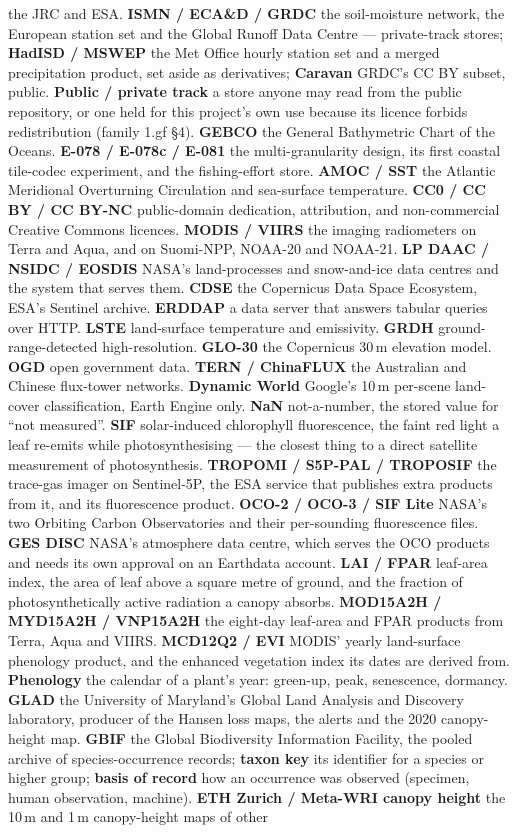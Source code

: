 \documentclass[10pt]{article}
\begin{document}
the JRC and ESA. \textbf{ISMN / ECA\&D / GRDC} the soil-moisture network, the European station set and the Global Runoff Data Centre --- private-track stores; \textbf{HadISD / MSWEP} the Met Office hourly station set and a merged precipitation product, set aside as derivatives; \textbf{Caravan} GRDC's CC BY subset, public. \textbf{Public / private track} a store anyone may read from the public repository, or one held for this project's own use because its licence forbids redistribution (family 1.gf \S4). \textbf{GEBCO} the General Bathymetric Chart of the Oceans. \textbf{E-078 / E-078c / E-081} the multi-granularity design, its first coastal tile-codec experiment, and the fishing-effort store. \textbf{AMOC / SST} the Atlantic Meridional Overturning Circulation and sea-surface temperature. \textbf{CC0 / CC BY / CC BY-NC} public-domain dedication, attribution, and non-commercial Creative Commons licences. \textbf{MODIS / VIIRS} the imaging radiometers on Terra and Aqua, and on Suomi-NPP, NOAA-20 and NOAA-21. \textbf{LP DAAC / NSIDC / EOSDIS} NASA's land-processes and snow-and-ice data centres and the system that serves them. \textbf{CDSE} the Copernicus Data Space Ecosystem, ESA's Sentinel archive. \textbf{ERDDAP} a data server that answers tabular queries over HTTP. \textbf{LSTE} land-surface temperature and emissivity. \textbf{GRDH} ground-range-detected high-resolution. \textbf{GLO-30} the Copernicus 30\,m elevation model. \textbf{OGD} open government data. \textbf{TERN / ChinaFLUX} the Australian and Chinese flux-tower networks. \textbf{Dynamic World} Google's 10\,m per-scene land-cover classification, Earth Engine only. \textbf{NaN} not-a-number, the stored value for ``not measured''. \textbf{SIF} solar-induced chlorophyll fluorescence, the faint red light a leaf re-emits while photosynthesising --- the closest thing to a direct satellite measurement of photosynthesis. \textbf{TROPOMI / S5P-PAL / TROPOSIF} the trace-gas imager on Sentinel-5P, the ESA service that publishes extra products from it, and its fluorescence product. \textbf{OCO-2 / OCO-3 / SIF Lite} NASA's two Orbiting Carbon Observatories and their per-sounding fluorescence files. \textbf{GES DISC} NASA's atmosphere data centre, which serves the OCO products and needs its own approval on an Earthdata account. \textbf{LAI / FPAR} leaf-area index, the area of leaf above a square metre of ground, and the fraction of photosynthetically active radiation a canopy absorbs. \textbf{MOD15A2H / MYD15A2H / VNP15A2H} the eight-day leaf-area and FPAR products from Terra, Aqua and VIIRS. \textbf{MCD12Q2 / EVI} MODIS' yearly land-surface phenology product, and the enhanced vegetation index its dates are derived from. \textbf{Phenology} the calendar of a plant's year: green-up, peak, senescence, dormancy. \textbf{GLAD} the University of Maryland's Global Land Analysis and Discovery laboratory, producer of the Hansen loss maps, the alerts and the 2020 canopy-height map. \textbf{GBIF} the Global Biodiversity Information Facility, the pooled archive of species-occurrence records; \textbf{taxon key} its identifier for a species or higher group; \textbf{basis of record} how an occurrence was observed (specimen, human observation, machine). \textbf{ETH Zurich / Meta-WRI canopy height} the 10\,m and 1\,m canopy-height maps of other 
\end{document}
